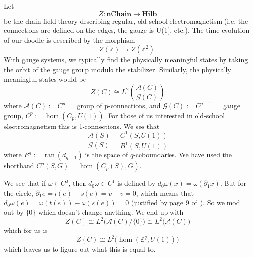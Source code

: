 \documentclass[draft]{amsart}
\numberwithin{equation}{section}
\begin{document}
Let 
\begin{equation}%
Z:\mathbf{nChain}\to\mathbf{Hilb}
\end{equation}
be the chain field theory describing regular, old-school
electromagnetism (i.e. the connections are defined on the edges,
the gauge is U(1), etc.). The time evolution of our doodle is
described by the morphism
\begin{equation}%
Z(\mathbb{Z})\to Z(\mathbb{Z}^{2}).
\end{equation}
With gauge systems, we typically find the physically meaningful
states by taking the orbit of the gauge group modulo the
stabilizer. Similarly, the physically meaningful states would be
\begin{equation}%
Z(C)\cong L^{2}\left(\frac{\mathcal{A}(C)}{\mathcal{G}(C)}\right)
\end{equation}
where $\mathcal{A}(C):=C^{p}=$ group of p-connections, and
$\mathcal{G}(C):=C^{p-1}=$ gauge group,
$C^{p}:=\hom(C_{p},U(1))$. For those of us interested in
old-school electromagnetism this is 1-connections. We see that
\begin{equation}%
\frac{\mathcal{A}(S)}{\mathcal{G}(S)} =
\frac{C^{1}(S,U(1))}{B^{1}(S,U(1))}
\end{equation}
where $B^{q}:=\operatorname{ran}(d_{q-1})$ is the space of
$q$-coboundaries. We have used the shorthand $C^{p}(S,G)=\hom(C_{p}(S),G)$.

We see that if $\omega\in C^{0}$, then $d_{0}\omega\in C^{1}$ is
defined by $d_{0}\omega(x)=\omega(\partial_{1}x)$. But for the
circle, $\partial_{1}e=t(e)-s(e)=v-v=0$, which means that
$d_{0}\omega(e)=\omega(t(e))-\omega(s(e))=0$ (justified by page 9
of~\cite{Wise:2006kg}). So we mod out by $\{0\}$ which doesn't
change anything. We end up with
\begin{equation}%
Z(C)\cong L^{2}\Big(\mathcal{A}(C)/\{0\}\Big)\cong L^{2}\Big(\mathcal{A}(C)\Big)
\end{equation}
which for us is 
\begin{equation}%
Z(C)\cong L^{2}\Big(\hom(\mathbb{Z}^{q},U(1))\Big)
\end{equation}
which leaves us to figure out what this is equal to.
\end{document}
